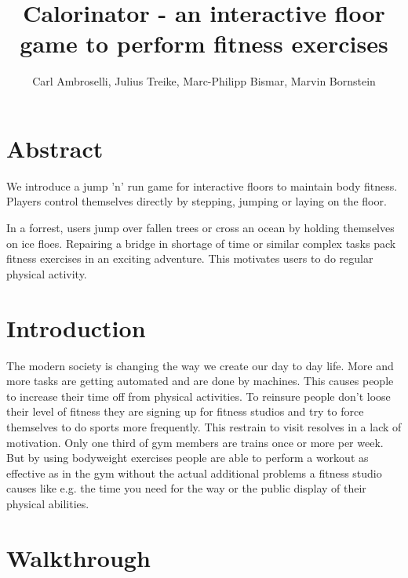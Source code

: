 \documentclass[twocolumn,showpacs,%
  nofootinbib,aps,superscriptaddress,%
  eqsecnum,prd,notitlepage,showkeys,10pt]{revtex4-1}
\newcommand*{\TitleFont}{%
      \usefont{\encodingdefault}{\rmdefault}{b}{n}%
      \fontsize{16}{20}%
      \selectfont}
\begin{document}
\title{\TitleFont Calorinator - an interactive floor game to perform fitness exercises}
\author{Carl Ambroselli, Julius Treike, Marc-Philipp Bismar, Marvin Bornstein}


\maketitle

\section{Abstract}

We introduce a jump 'n' run game for interactive floors to maintain body fitness. Players control themselves directly by stepping, jumping or laying on the   floor.

In a forrest, users jump over fallen trees or cross an ocean by holding themselves on ice floes. Repairing a bridge in shortage of time or similar complex    tasks pack fitness exercises in an exciting adventure. This motivates users to do regular physical activity.

\section{Introduction}

The modern society is changing the way we create our day to day life. More and more tasks are getting automated and are done by machines. This causes people to increase their time off from physical activities.
To reinsure people don’t loose their level of fitness they are signing up for fitness studios and try to force themselves to do sports more frequently.  This restrain to visit resolves in a lack of motivation. Only one third of gym members are trains once or more per week.
But by using bodyweight exercises people are able to perform a workout as effective as in the gym without the actual additional problems a fitness studio causes like e.g. the time you need for the way or the public display of their physical abilities.

\section{Walkthrough}
\end{document}
